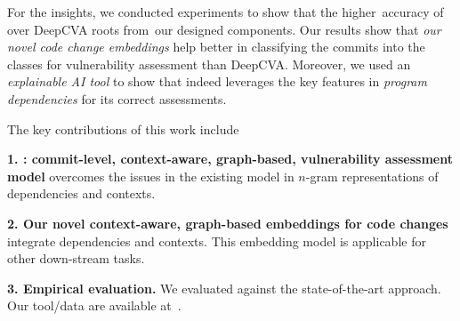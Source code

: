 
For the insights, we conducted experiments to show that the
higher~accuracy of {\tool} over DeepCVA roots from~our designed
components.
Our results show that {\em our novel code change embeddings} help
{\tool} better in classifying the commits into the classes for
vulnerability assessment than DeepCVA. Moreover, we used an {\em
  explainable AI tool} to show that {\tool} indeed leverages the key
features in {\em program dependencies} for its correct
assessments.

The key contributions of this work include

{\bf 1. {\tool}: commit-level, context-aware, graph-based, 
  vulnerability assessment model} overcomes the issues in the
existing model in $n$-gram representations of dependencies and
contexts.

{\bf 2. Our novel context-aware, graph-based embeddings for code
  changes}
integrate dependencies and contexts. This embedding model
is applicable for other down-stream tasks.


{\bf 3. Empirical evaluation.} We evaluated {\tool} 
against the state-of-the-art approach.
Our tool/data are available at~\cite{cat-website}.

